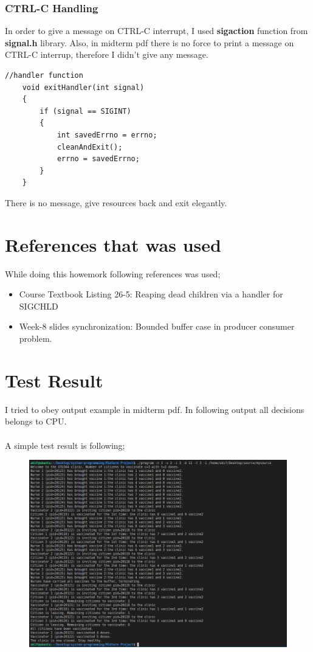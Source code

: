 \documentclass{article}
\begin{document}
\subsubsection{CTRL-C Handling}
In order to give a message on CTRL-C interrupt, I used \textbf{sigaction} function from \textbf{signal.h} library.
Also, in midterm pdf there is no force to print a message on CTRL-C interrup, therefore I didn't give any message.
\begin{lstlisting}[style=CStyle]
    //handler function
    void exitHandler(int signal)
    {
        if (signal == SIGINT)
        {
            int savedErrno = errno;
            cleanAndExit();
            errno = savedErrno;
        }
    }
\end{lstlisting}
There is no message, give resources back and exit elegantly.
\section{References that was used} 
While doing this howemork following references was used;
\begin{itemize}
	\item Course Textbook Listing 26-5: Reaping dead children via a handler for SIGCHLD
	\item Week-8 slides synchronization: Bounded buffer case in producer consumer problem.
\end{itemize}
\cleardoublepage
\section{Test Result}
I tried to obey output example in midterm pdf. In following output all decisions belongs to CPU. \\ \\
A simple test result is following;
\begin{figure}[H]
\includegraphics[width=1\textwidth, left]{result.JPG}
\caption[Optional caption]{}
\label{}
		
\end{figure}                              
\end{document}
